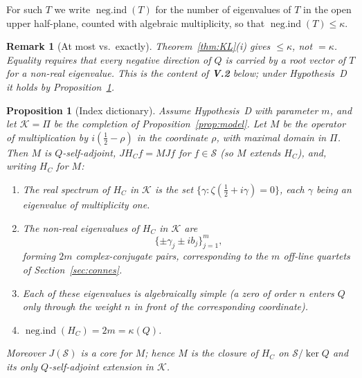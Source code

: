 \documentclass[11pt]{amsart}
\newtheorem{proposition}[theorem]{Proposition}
\newtheorem{remark}[theorem]{Remark}
\newcommand{\kap}{\kappa}
\newcommand{\negind}{\operatorname{neg.ind}}
\newcommand{\Kcal}{\mathcal{K}}
\newcommand{\Scal}{\mathcal{S}}
\begin{document}
For such $T$ we write $\negind(T)$ for the number of eigenvalues of $T$ in the open upper
half-plane, counted with algebraic multiplicity, so that $\negind(T)\le\kap$.

\begin{remark}[At most vs.\ exactly]\label{rem:atmost}
Theorem~\ref{thm:KL}(i) gives $\le \kap$, not $= \kap$.  Equality requires that every negative
direction of $Q$ is carried by a root vector of $T$ for a non-real eigenvalue.  This is the
content of \textbf{V.2} below; under Hypothesis~D it holds by
Proposition~\ref{conj:bridge}.
\end{remark}

\begin{proposition}[Index dictionary]\label{conj:bridge}
Assume Hypothesis~D with parameter $m$, and let $\Kcal=\Pi$ be the completion of
Proposition~\ref{prop:model}.  Let $M$ be the operator of multiplication by $i(\tfrac12-\rho)$
in the coordinate $\rho$, with maximal domain in $\Pi$.  Then $M$ is $Q$-self-adjoint,
$JH_Cf=MJf$ for $f\in\Scal$ (so $M$ extends $H_C$), and, writing $H_C$ for $M$:
\begin{enumerate}
\item[\emph{(i)}] The real spectrum of $H_C$ in $\Kcal$ is the set
  $\{\gamma:\zeta(\tfrac12+i\gamma)=0\}$, each $\gamma$ being an eigenvalue of multiplicity one.
\item[\emph{(ii)}] The non-real eigenvalues of $H_C$ in $\Kcal$ are
  \[
    \{\pm\gamma_j \pm ib_j\}_{j=1}^m,
  \]
  forming $2m$ complex-conjugate pairs, corresponding to the $m$ off-line quartets of
  Section~\ref{sec:connes}.
\item[\emph{(iii)}] Each of these eigenvalues is algebraically simple (a zero of order $n$
  enters $Q$ only through the weight $n$ in front of the corresponding coordinate).
\item[\emph{(iv)}] $\negind(H_C) = 2m=\kap(Q)$.
\end{enumerate}
Moreover $J(\Scal)$ is a core for $M$; hence $M$ is the closure of $H_C$ on $\Scal/\ker Q$ and
its only $Q$-self-adjoint extension in $\Kcal$.
\end{proposition}
\end{document}
